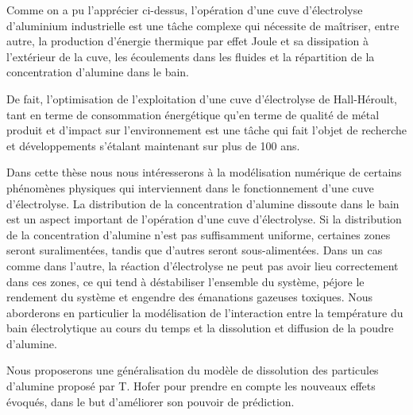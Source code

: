 Comme on a pu l'apprécier ci-dessus, l'opération d'une cuve
d'électrolyse d'aluminium industrielle est une tâche complexe qui
nécessite de maîtriser, entre autre, la production d'énergie thermique
par effet Joule et sa dissipation à l'extérieur de la cuve, les
écoulements dans les fluides et la répartition de la concentration
d'alumine dans le bain.

De fait, l'optimisation de l'exploitation d'une cuve d'électrolyse de
Hall-Héroult, tant en terme de consommation énergétique qu'en terme de
qualité de métal produit et d'impact sur l'environnement est une tâche
qui fait l'objet de recherche et développements s'étalant maintenant
sur plus de 100 ans.

Dans cette thèse nous nous intéresserons à la modélisation numérique
de certains phénomènes physiques qui interviennent dans le
fonctionnement d'une cuve d'électrolyse. La distribution de la
concentration d'alumine dissoute dans le bain est un aspect important
de l'opération d'une cuve d'électrolyse. Si la distribution de la
concentration d'alumine n'est pas suffisamment uniforme, certaines
zones seront suralimentées, tandis que d'autres seront
sous-alimentées. Dans un cas comme dans l'autre, la réaction
d'électrolyse ne peut pas avoir lieu correctement dans ces zones, ce
qui tend à déstabiliser l'ensemble du système, péjore le rendement du
système et engendre des émanations gazeuses toxiques. Nous aborderons
en particulier la modélisation de l'interaction entre la température
du bain électrolytique au cours du temps et la dissolution et
diffusion de la poudre d'alumine.

Nous proposerons une généralisation du modèle de dissolution des
particules d'alumine proposé par T. Hofer \cite{Hofer2011} pour
prendre en compte les nouveaux effets évoqués, dans le but d'améliorer
son pouvoir de prédiction.

